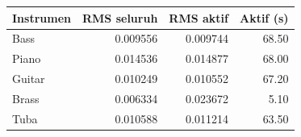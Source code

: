 \begin{tabular}{lrrr}
\toprule
Instrumen & RMS seluruh & RMS aktif & Aktif (s) \\
\midrule
Bass & 0.009556 & 0.009744 & 68.50 \\
Piano & 0.014536 & 0.014877 & 68.00 \\
Guitar & 0.010249 & 0.010552 & 67.20 \\
Brass & 0.006334 & 0.023672 & 5.10 \\
Tuba & 0.010588 & 0.011214 & 63.50 \\
\bottomrule
\end{tabular}
